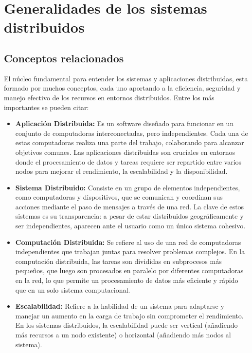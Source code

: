\chapter{Generalidades de los sistemas distribuidos}

\section{Conceptos relacionados}
\noindent

El núcleo fundamental para entender los sistemas y aplicaciones distribuidas, esta formado por muchos conceptos, cada uno aportando a la eficiencia, seguridad y manejo efectivo de los recursos en entornos distribuidos. Entre los más importantes se pueden citar:

\begin{itemize}
	\item \textbf{Aplicación Distribuida:} Es un software diseñado para funcionar en un conjunto de computadoras interconectadas, pero independientes. Cada una de estas computadoras realiza una parte del trabajo, colaborando para alcanzar objetivos comunes. Las aplicaciones distribuidas son cruciales en entornos donde el procesamiento de datos y tareas requiere ser repartido entre varios nodos para mejorar el rendimiento, la escalabilidad y la disponibilidad.
	
	\item \textbf{Sistema Distribuido:} Consiste en un grupo de elementos independientes, como computadoras y dispositivos, que se comunican y coordinan sus acciones mediante el paso de mensajes a través de una red. La clave de estos sistemas es su transparencia: a pesar de estar distribuidos geográficamente y ser independientes, aparecen ante el usuario como un único sistema cohesivo.
	
	\item \textbf{Computación Distribuida:} Se refiere al uso de una red de computadoras independientes que trabajan juntas para resolver problemas complejos. En la computación distribuida, las tareas son divididas en subprocesos más pequeños, que luego son procesados en paralelo por diferentes computadoras en la red, lo que permite un procesamiento de datos más eficiente y rápido que en un solo sistema computacional.
	
	\item \textbf{Escalabilidad:} Refiere a la habilidad de un sistema para adaptarse y manejar un aumento en la carga de trabajo sin comprometer el rendimiento. En los sistemas distribuidos, la escalabilidad puede ser vertical (añadiendo más recursos a un nodo existente) o horizontal (añadiendo más nodos al sistema).
	

\end{itemize}
